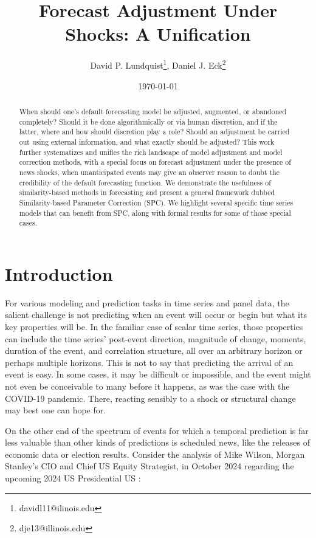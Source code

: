 \documentclass[11pt]{article}
\title{Forecast Adjustment Under Shocks: A Unification}
\author{David P. Lundquist\thanks{davidl11@ilinois.edu}, Daniel J. Eck\thanks{dje13@illinois.edu} }
\affil{Department of Statistics, University of Illinois at Urbana-Champaign}
\date{\today}
\theoremstyle{definition}
\begin{document}
\maketitle

\begin{abstract} 
  When should one's default forecasting model be adjusted, augmented, or abandoned completely?  Should it be done algorithmically or via human discretion, and if the latter, where and how should discretion play a role?  Should an adjustment be carried out using external information, and what exactly should be adjusted?  This work further systematizes and unifies the rich landscape of model adjustment and model correction methods, with a special focus on forecast adjustment under the presence of news shocks, when unanticipated events may give an observer reason to doubt the credibility of the default forecasting function.  We demonstrate the usefulness of similarity-based methods in forecasting and present a general framework dubbed Similarity-based Parameter Correction (SPC).  We highlight several specific time series models that can benefit from SPC, along with formal results for some of those special cases.
\end{abstract}


\section{Introduction}\label{Introduction}

For various modeling and prediction tasks in time series and panel data, the salient challenge is not predicting when an event will occur or begin but what its key properties will be.  In the familiar case of scalar time series, those properties can include the time series' post-event direction, magnitude of change, moments, duration of the event, and correlation structure, all over an arbitrary horizon or perhaps multiple horizons. This is not to say that predicting the arrival of an event is easy. In some cases, it may be difficult or impossible, and the event might not even be conceivable to many before it happens, as was the case with the COVID-19 pandemic.  There, reacting sensibly to a shock or structural change may best one can hope for.

On the other end of the spectrum of events for which a temporal prediction is far less valuable than other kinds of predictions is scheduled news, like the releases of economic data or election results.  Consider the analysis of Mike Wilson, Morgan Stanley’s CIO and Chief US Equity  Strategist, in October 2024 regarding the upcoming 2024 US Presidential US \citep{thoughts_on_market}:
\end{document}
